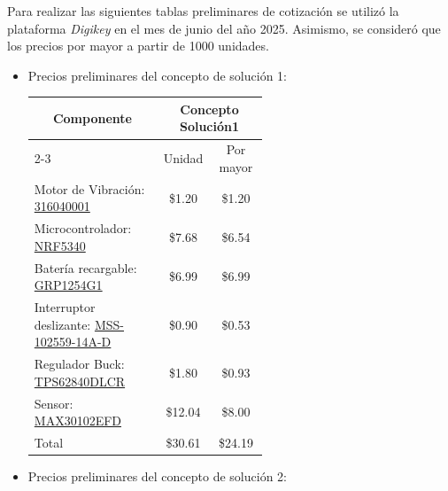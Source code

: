 
Para realizar las siguientes tablas preliminares de cotización se utilizó la plataforma \textit{Digikey} en el mes de junio del año 2025. Asimismo, se consideró que los precios por mayor a partir de 1000 unidades. \\
\begin{itemize}
\item Precios preliminares del concepto de solución 1: 


\begin{table}[H]
\centering
{}
\begin{tabular}{|p{0.55\linewidth}|c|c|} 
\hline
\multicolumn{1}{|c|}{\multirow{2}{*}{Componente}} & \multicolumn{2}{c|}{Concepto Solución1} \\ 
\cline{2-3}
\multicolumn{1}{|c|}{} & Unidad & Por mayor \\ 
\hline
Motor de Vibración: \href{https://www.digikey.com/en/products/detail/seeed-technology-co-ltd/316040001/5487672}{316040001} & \$1.20 & \$1.20 \\ 
\hline
Microcontrolador: \href{https://www.digikey.com/en/products/detail/nordic-semiconductor-asa/NRF5340-QKAA-R/13559661}{NRF5340} & \$7.68 & \$6.54 \\ 
\hline
Batería recargable: \href{https://www.digikey.com/en/products/detail/grepow-inc/GRP1254G1-3C-3-85V-75mAh/25603168}{GRP1254G1} & \$6.99 & \$6.99 \\ 
\hline
Interruptor deslizante: \href{https://www.digikey.com/en/products/detail/same-sky-formerly-cui-devices/MSS-102559-14A-D/13978983}{MSS-102559-14A-D} & \$0.90 & \$0.53 \\ 
\hline
Regulador Buck: \href{https://www.digikey.com/en/products/detail/texas-instruments/TPS62840DLCR/10445071}{TPS62840DLCR} & \$1.80 & \$0.93 \\ 
\hline
Sensor: \href{https://www.digikey.com/en/products/detail/analog-devices-inc-maxim-integrated/MAX30102EFD-T/6188734}{MAX30102EFD} & \$12.04 & \$8.00 \\ 
\hhline{|===|}
Total & \$30.61 & \$24.19 \\
\hline
\end{tabular}
\end{table}


\item Precios preliminares del concepto de solución 2:



\end{itemize}
